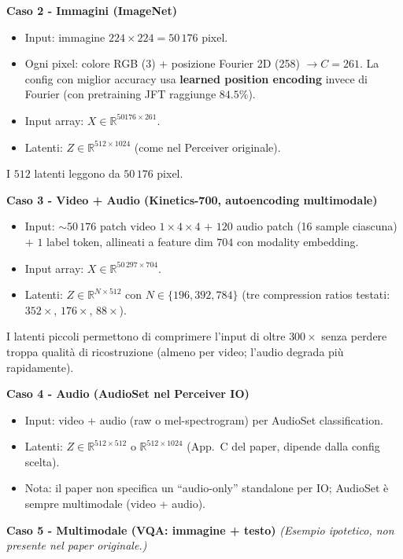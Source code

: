 \documentclass[
  11pt,
]{article}
\begin{document}
\textbf{Caso 2 - Immagini (ImageNet)}

\begin{itemize}
\item Input: immagine $224 \times 224 = 50\,176$ pixel.
\item Ogni pixel: colore RGB (3) + posizione Fourier 2D (258) $\to C = 261$. La config con miglior accuracy usa \textbf{learned position encoding} invece di Fourier (con pretraining JFT raggiunge $84.5\%$).
\item Input array: $X \in \mathbb{R}^{50176 \times 261}$.
\item Latenti: $Z \in \mathbb{R}^{512 \times 1024}$ (come nel Perceiver originale).
\end{itemize}

I $512$ latenti leggono da $50\,176$ pixel.

\textbf{Caso 3 - Video + Audio (Kinetics-700, autoencoding multimodale)}

\begin{itemize}
\item Input: $\sim 50\,176$ patch video $1 \times 4 \times 4$ $+$ $120$ audio patch (16 sample ciascuna) $+$ $1$ label token, allineati a feature dim $704$ con modality embedding.
\item Input array: $X \in \mathbb{R}^{50\,297 \times 704}$.
\item Latenti: $Z \in \mathbb{R}^{N \times 512}$ con $N \in \{196, 392, 784\}$ (tre compression ratios testati: $352\times$, $176\times$, $88\times$).
\end{itemize}

I latenti piccoli permettono di comprimere l'input di oltre $300\times$ senza perdere troppa qualità di ricostruzione (almeno per video; l'audio degrada più rapidamente).

\textbf{Caso 4 - Audio (AudioSet nel Perceiver IO)}

\begin{itemize}
\item Input: video + audio (raw o mel-spectrogram) per AudioSet classification.
\item Latenti: $Z \in \mathbb{R}^{512 \times 512}$ o $\mathbb{R}^{512 \times 1024}$ (App.\ C del paper, dipende dalla config scelta).
\item Nota: il paper non specifica un ``audio-only'' standalone per IO; AudioSet è sempre multimodale (video + audio).
\end{itemize}

\textbf{Caso 5 - Multimodale (VQA: immagine + testo)}
\emph{(Esempio ipotetico, non presente nel paper originale.)}
\end{document}
